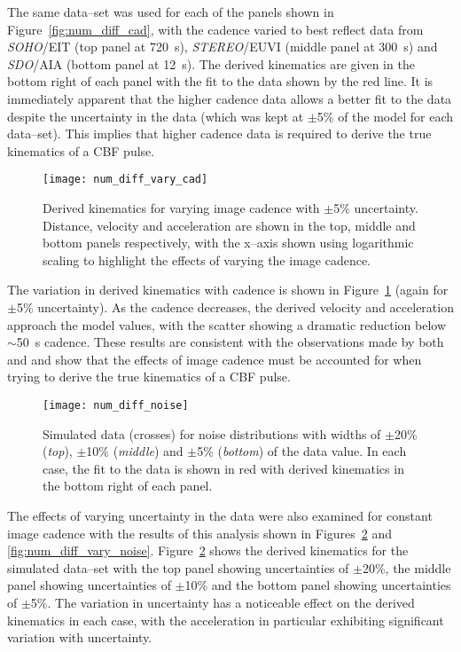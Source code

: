The same data--set was used for each of the panels shown in Figure~\ref{fig:num_diff_cad}, with the cadence varied to best reflect data from \emph{SOHO}/EIT (top panel at 720~s), \emph{STEREO}/EUVI (middle panel at 300~s) and \emph{SDO}/AIA (bottom panel at 12~s). The derived kinematics are given in the bottom right of each panel with the fit to the data shown by the red line. It is immediately apparent that the higher cadence data allows a better fit to the data despite the uncertainty in the data (which was kept at $\pm$5\% of the model for each data--set). This implies that higher cadence data is required to derive the true kinematics of a CBF pulse.

\begin{figure}[!t]
\begin{center}
\texttt{[image: num\_diff\_vary\_cad]}
\caption{Derived kinematics for varying image cadence with $\pm$5\% uncertainty. Distance, velocity and acceleration are shown in the top, middle and bottom panels respectively, with the x--axis shown using logarithmic scaling to highlight the effects of varying the image cadence.}
\label{fig:num_diff_vary_cad}
\end{center}
\end{figure}

The variation in derived kinematics with cadence is shown in Figure~\ref{fig:num_diff_vary_cad} (again for $\pm$5\% uncertainty). As the cadence decreases, the derived velocity and acceleration approach the model values, with the scatter showing a dramatic reduction below $\sim$50~s cadence. These results are consistent with the observations made by both \citet{Long:2008eu} and \citet{Ma:2009ab} and show that the effects of image cadence must be accounted for when trying to derive the true kinematics of a CBF pulse.

\begin{figure}[!t]
\begin{center}
\texttt{[image: num\_diff\_noise]}
\caption{Simulated data (crosses) for noise distributions with widths of $\pm$20\% (\emph{top}), $\pm$10\%  (\emph{middle}) and $\pm$5\%  (\emph{bottom}) of the data value. In each case, the fit to the data is shown in red with derived kinematics in the bottom right of each panel.}
\label{fig:num_diff_noise}
\end{center}
\end{figure}

The effects of varying uncertainty in the data were also examined for constant image cadence with the results of this analysis shown in Figures~\ref{fig:num_diff_noise} and \ref{fig:num_diff_vary_noise}. Figure~\ref{fig:num_diff_noise} shows the derived kinematics for the simulated data--set with the top panel showing uncertainties of $\pm$20\%, the middle panel showing uncertainties of $\pm$10\% and the bottom panel showing uncertainties of $\pm$5\%. The variation in uncertainty has a noticeable effect on the derived kinematics in each case, with the acceleration in particular exhibiting significant variation with uncertainty. 

